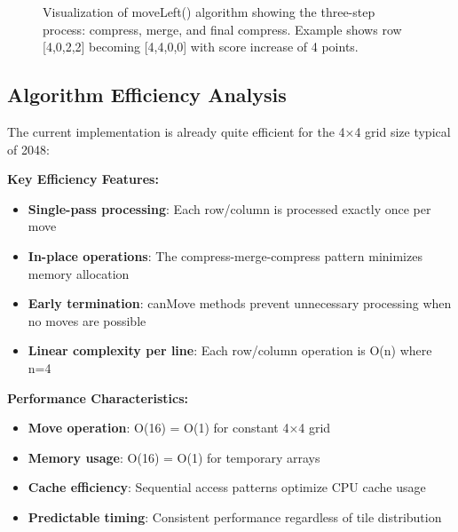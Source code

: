 \documentclass[12pt, a4paper]{article}
\begin{document}
\begin{figure}[H]
\caption{Visualization of moveLeft() algorithm showing the three-step process: compress, merge, and final compress. Example shows row [4,0,2,2] becoming [4,4,0,0] with score increase of 4 points.}
\end{figure}

\subsection{Algorithm Efficiency Analysis}
The current implementation is already quite efficient for the 4×4 grid size typical of 2048:

\textbf{Key Efficiency Features:}
\begin{itemize}
    \item \textbf{Single-pass processing}: Each row/column is processed exactly once per move
    \item \textbf{In-place operations}: The compress-merge-compress pattern minimizes memory allocation
    \item \textbf{Early termination}: canMove methods prevent unnecessary processing when no moves are possible
    \item \textbf{Linear complexity per line}: Each row/column operation is O(n) where n=4
\end{itemize}

\textbf{Performance Characteristics:}
\begin{itemize}
    \item \textbf{Move operation}: O(16) = O(1) for constant 4×4 grid
    \item \textbf{Memory usage}: O(16) = O(1) for temporary arrays
    \item \textbf{Cache efficiency}: Sequential access patterns optimize CPU cache usage
    \item \textbf{Predictable timing}: Consistent performance regardless of tile distribution
\end{itemize}
\end{document}
